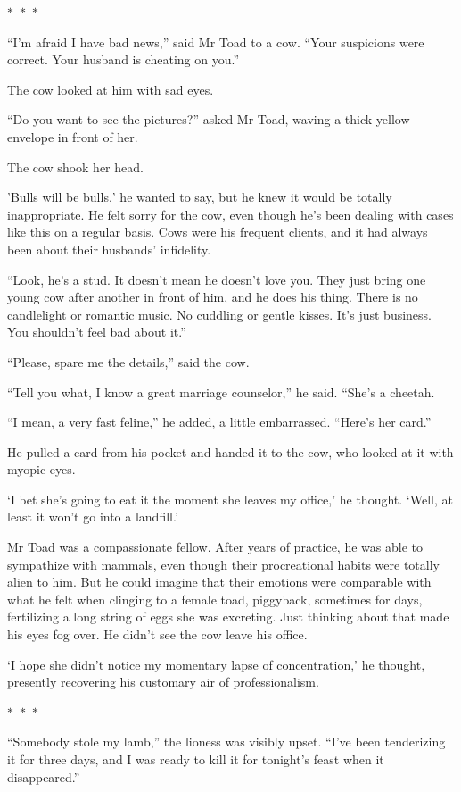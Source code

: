 \documentclass{memoir}
\newcommand{\starbreak}{%
\begin{center}
  $\ast$~$\ast$~$\ast$
\end{center}
}
\begin{document}
\starbreak

``I'm afraid I have bad news,'' said Mr Toad to a cow. ``Your suspicions were correct. Your husband is cheating on you.''

The cow looked at him with sad eyes.

``Do you want to see the pictures?'' asked Mr Toad, waving a thick yellow envelope in front of her. 

The cow shook her head. 

'Bulls will be bulls,' he wanted to say, but he knew it would be totally inappropriate. He felt sorry for the cow, even though he's been dealing with cases like this on a regular basis. Cows were his frequent clients, and it had always been about their husbands' infidelity. 

``Look, he's a stud. It doesn't mean he doesn't love you. They just bring one young cow after another in front of him, and he does his thing. There is no candlelight or romantic music. No cuddling or gentle kisses. It's just business. You shouldn't feel bad about it.''

``Please, spare me the details,'' said the cow.

``Tell you what, I know a great marriage counselor,'' he said. ``She's a cheetah.

``I mean, a very fast feline,'' he added, a little embarrassed. ``Here's her card.''

He pulled a card from his pocket and handed it to the cow, who looked at it with myopic eyes.

`I bet she's going to eat it the moment she leaves my office,' he thought. `Well, at least it won't go into a landfill.'

Mr Toad was a compassionate fellow. After years of practice, he was able to sympathize with mammals, even though their procreational habits were totally alien to him. But he could imagine that their emotions were comparable with what he felt when clinging to a female toad, piggyback, sometimes for days, fertilizing a long string of eggs she was excreting. Just thinking about that made his eyes fog over. He didn't see the cow leave his office. 

`I hope she didn't notice my momentary lapse of concentration,' he thought, presently recovering his customary air of professionalism. 

\starbreak


``Somebody stole my lamb,'' the lioness was visibly upset. ``I've been tenderizing it for three days, and I was ready to kill it for tonight's feast when it disappeared.''
\end{document}
